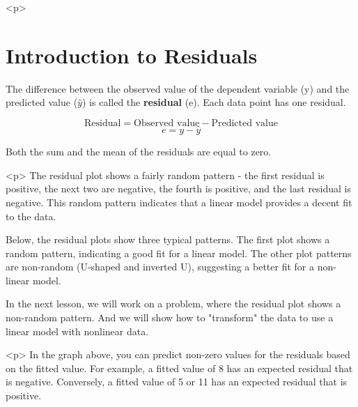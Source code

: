 ﻿
\maketitle

\tableofcontents
<p>

\section{Introduction to Residuals}

The difference between the observed value of the dependent variable (y) and the predicted value ($\hat{y}$) is called the \textbf{residual} (e). Each data point has one residual.

\[\mbox{Residual} = \mbox{Observed value} - \mbox{Predicted value}\] 
\[e = y - \hat{y}\]

Both the sum and the mean of the residuals are equal to zero. 


<p>
The residual plot shows a fairly random pattern - the first residual is positive, the next two are negative, the fourth is positive, and the last residual is negative. This random pattern indicates that a linear model provides a decent fit to the data.

Below, the residual plots show three typical patterns. The first plot shows a random pattern, indicating a good fit for a linear model. The other plot patterns are non-random (U-shaped and inverted U), suggesting a better fit for a non-linear model.


In the next lesson, we will work on a problem, where the residual plot shows a non-random pattern. And we will show how to "transform" the data to use a linear model with nonlinear data.

<p>
In the graph above, you can predict non-zero values for the residuals based on the fitted value. For example, a fitted value of 8 has an expected residual that is negative. Conversely, a fitted value of 5 or 11 has an expected residual that is positive.




